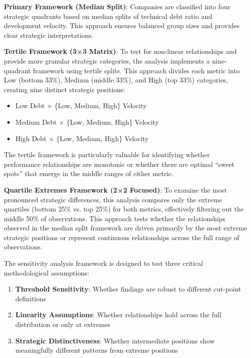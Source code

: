 \textbf{Primary Framework (Median Split)}: Companies are classified into four strategic quadrants based on median splits of technical debt ratio and development velocity. This approach ensures balanced group sizes and provides clear strategic interpretations.

\textbf{Tertile Framework (3×3 Matrix)}: To test for non-linear relationships and provide more granular strategic categories, the analysis implements a nine-quadrant framework using tertile splits. This approach divides each metric into Low (bottom 33\%), Medium (middle 33\%), and High (top 33\%) categories, creating nine distinct strategic positions:

\begin{itemize}
    \item Low Debt × \{Low, Medium, High\} Velocity
    \item Medium Debt × \{Low, Medium, High\} Velocity
    \item High Debt × \{Low, Medium, High\} Velocity
\end{itemize}

The tertile framework is particularly valuable for identifying whether performance relationships are monotonic or whether there are optimal ``sweet spots'' that emerge in the middle ranges of either metric.

\textbf{Quartile Extremes Framework (2×2 Focused)}: To examine the most pronounced strategic differences, this analysis compares only the extreme quartiles (bottom 25\% vs. top 25\%) for both metrics, effectively filtering out the middle 50\% of observations. This approach tests whether the relationships observed in the median split framework are driven primarily by the most extreme strategic positions or represent continuous relationships across the full range of observations.

The sensitivity analysis framework is designed to test three critical methodological assumptions:
\begin{enumerate}
    \item \textbf{Threshold Sensitivity}: Whether findings are robust to different cut-point definitions
    \item \textbf{Linearity Assumptions}: Whether relationships hold across the full distribution or only at extremes
    \item \textbf{Strategic Distinctiveness}: Whether intermediate positions show meaningfully different patterns from extreme positions
\end{enumerate}

